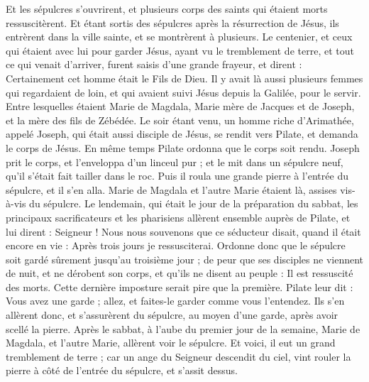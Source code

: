 \begin{multicols}{2}
Et les sépulcres s'ouvrirent, et plusieurs corps des saints qui étaient morts ressuscitèrent.
Et étant sortis des sépulcres après la résurrection de Jésus, ils entrèrent dans la ville sainte, et se montrèrent à plusieurs.
Le centenier, et ceux qui étaient avec lui pour garder Jésus, ayant vu le tremblement de terre, et tout ce qui venait d'arriver, furent saisis d'une grande frayeur, et dirent : Certainement cet homme était le Fils de Dieu.
Il y avait là aussi plusieurs femmes qui regardaient de loin, et qui avaient suivi Jésus depuis la Galilée, pour le servir.
Entre lesquelles étaient Marie de Magdala, Marie mère de Jacques et de Joseph, et la mère des fils de Zébédée.
Le soir étant venu, un homme riche d'Arimathée, appelé Joseph, qui était aussi disciple de Jésus,
se rendit vers Pilate, et demanda le corps de Jésus. En même temps Pilate ordonna que le corps soit rendu.
Joseph prit le corps, et l'enveloppa d'un linceul pur ;
et le mit dans un sépulcre neuf, qu'il s'était fait tailler dans le roc. Puis il roula une grande pierre à l'entrée du sépulcre, et il s'en alla.
Marie de Magdala et l'autre Marie étaient là, assises vis-à-vis du sépulcre.
Le lendemain, qui était le jour de la préparation du sabbat, les principaux sacrificateurs et les pharisiens allèrent ensemble auprès de Pilate,
et lui dirent : Seigneur ! Nous nous souvenons que ce séducteur disait, quand il était encore en vie : Après trois jours je ressusciterai.
Ordonne donc que le sépulcre soit gardé sûrement jusqu'au troisième jour ; de peur que ses disciples ne viennent de nuit, et ne dérobent son corps, et qu'ils ne disent au peuple : Il est ressuscité des morts. Cette dernière imposture serait pire que la première.
Pilate leur dit : Vous avez une garde ; allez, et faites-le garder comme vous l'entendez.
Ils s'en allèrent donc, et s'assurèrent du sépulcre, au moyen d'une garde, après avoir scellé la pierre.
\VerseOne{}Après le sabbat, à l'aube du premier jour de la semaine, Marie de Magdala, et l'autre Marie, allèrent voir le sépulcre.
Et voici, il eut un grand tremblement de terre ; car un ange du Seigneur descendit du ciel, vint rouler la pierre à côté de l'entrée du sépulcre, et s'assit dessus.

\end{multicols}
